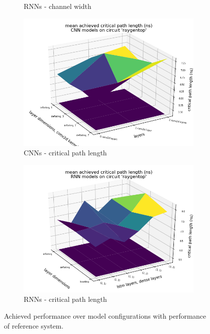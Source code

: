 \begin{figure}
\begin{subfigure}[b]{0.45\linewidth}
		\caption{\glspl{RNN} - channel width}
	\end{subfigure}
	\begin{subfigure}[b]{0.45\linewidth}
		\includegraphics[width=\linewidth]{plots/cnn-hyperopt-critical-path-with-reference.png}
		\caption{\glspl{CNN} - critical path length}
	\end{subfigure}
	\begin{subfigure}[b]{0.45\linewidth}
		\includegraphics[width=\linewidth]{plots/rnn-hyperopt-critical-path-with-reference.png}
		\caption{\glspl{RNN} - critical path length}
	\end{subfigure}
	\caption{Achieved performance over model configurations with performance of reference system.}
	\label{fig:eval-hyperopt-surface-reference}
\end{figure}

